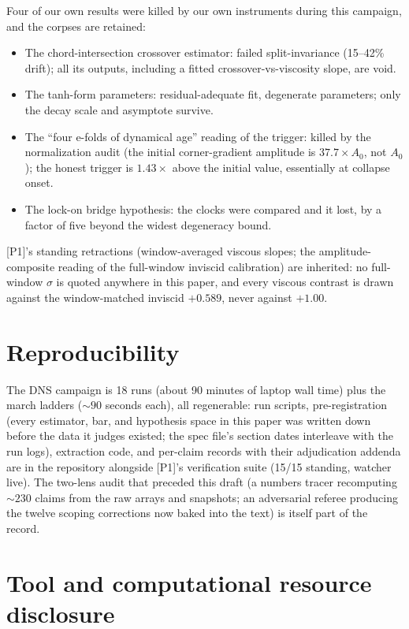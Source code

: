 \documentclass[11pt]{article}
\newcommand{\Anaught}{A_0}
\begin{document}
Four of our own results were killed by our own instruments during this
campaign, and the corpses are retained:

\begin{itemize}
\item The chord-intersection crossover estimator: failed
  split-invariance (15--42\% drift); all its outputs, including a
  fitted crossover-vs-viscosity slope, are void.
\item The tanh-form parameters: residual-adequate fit, degenerate
  parameters; only the decay scale and asymptote survive.
\item The ``four e-folds of dynamical age'' reading of the trigger:
  killed by the normalization audit (the initial corner-gradient
  amplitude is $37.7\times\Anaught$, not $\Anaught$); the honest
  trigger is $1.43\times$ above the initial value, essentially at
  collapse onset.
\item The lock-on bridge hypothesis: the clocks were compared and it
  lost, by a factor of five beyond the widest degeneracy bound.
\end{itemize}

[P1]'s standing retractions (window-averaged viscous slopes; the
amplitude-composite reading of the full-window inviscid calibration)
are inherited: no full-window $\sigma$ is quoted anywhere in this
paper, and every viscous contrast is drawn against the window-matched
inviscid $+0.589$, never against $+1.00$.

\section{Reproducibility}\label{sec:repro}

The DNS campaign is 18 runs (about 90 minutes of laptop wall time)
plus the march ladders (${\sim}90$ seconds each), all regenerable: run
scripts, pre-registration (every estimator, bar, and hypothesis space
in this paper was written down before the data it judges existed; the
spec file's section dates interleave with the run logs), extraction
code, and per-claim records with their adjudication addenda are in the
repository alongside [P1]'s verification suite (15/15 standing,
watcher live). The two-lens audit that preceded this draft (a numbers
tracer recomputing ${\sim}230$ claims from the raw arrays and
snapshots; an adversarial referee producing the twelve scoping
corrections now baked into the text) is itself part of the record.


\section{Tool and computational resource disclosure}\label{sec:disclosure}
\end{document}
